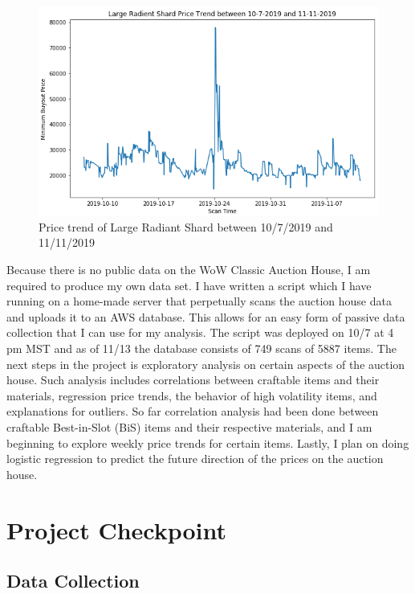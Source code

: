 \documentclass[sigconf]{acmart}
\begin{document}
\begin{figure}[h]
  \centering
  \includegraphics[width=\linewidth]{LRS_Price_Trend}
  \caption{Price trend of Large Radiant Shard between 10/7/2019 and 11/11/2019}
\end{figure}

	Because there is no public data on the WoW Classic Auction House, I am required to produce my own data set. I have written a script which I have running on a home-made server that perpetually scans the auction house data and uploads it to an AWS database. This allows for an easy form of passive data collection that I can use for my analysis. The script was deployed on 10/7 at 4 pm MST and as of 11/13 the database consists of 749 scans of 5887 items. The next steps in the project is exploratory analysis on certain aspects of the auction house. Such analysis includes correlations between craftable items and their materials, regression price trends, the behavior of high volatility items, and explanations for outliers. So far correlation analysis had been done between craftable Best-in-Slot (BiS) items and their respective materials, and I am beginning to explore weekly price trends for certain items. Lastly, I plan on doing logistic regression to predict the future direction of the prices on the auction house.

\section{Project Checkpoint}

\subsection{Data Collection}
\end{document}

